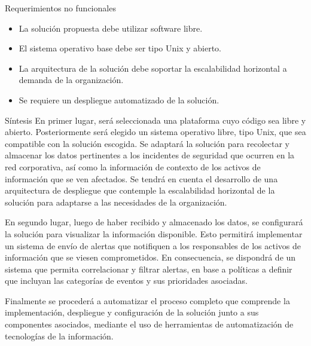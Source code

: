     \begin{section}{Requerimientos no funcionales}
    \begin{itemize}
        \item La solución propuesta debe utilizar software libre.
        \item El sistema operativo base debe ser tipo Unix y abierto.
        \item La arquitectura de la solución debe soportar la escalabilidad horizontal a demanda de la organización.
        \item Se requiere un despliegue automatizado de la solución.
    \end{itemize}
    \end{section}
    
    \begin{section}{Síntesis}
    En primer lugar, será seleccionada una plataforma cuyo código sea libre y abierto. Posteriormente será elegido un sistema operativo libre, tipo Unix, que sea compatible con la solución escogida. Se adaptará la solución para recolectar y almacenar los datos pertinentes a los incidentes de seguridad que ocurren en la red corporativa, así como la información de contexto de los activos de información que se ven afectados. Se tendrá en cuenta el desarrollo de una arquitectura de despliegue que contemple la escalabilidad horizontal de la solución para adaptarse a las necesidades de la organización. \par
	En segundo lugar, luego de haber recibido y almacenado los datos, se configurará la solución para visualizar la información disponible. Esto permitirá implementar un sistema de envío de alertas que notifiquen a los responsables de los activos de información que se viesen comprometidos. En consecuencia, se dispondrá de un sistema que permita correlacionar y filtrar alertas, en base a políticas a definir que incluyan las categorías de eventos y sus prioridades asociadas.\par
	Finalmente se procederá a automatizar el proceso completo que comprende la implementación, despliegue y configuración de la solución junto a sus componentes asociados, mediante el uso de herramientas de automatización de tecnologías de la información. \par
    \end{section}